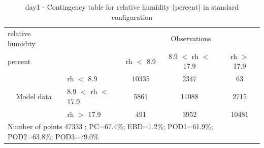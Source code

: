 \begin{table}[p!]
\begin{center}
\begin{tabular}{llccc}
\hline
{relative humidity}                                       &                                                    & \multicolumn{3}{c}{Observations}                 \\
{percent}                                       &                             & rh $<$ 8.9   & 8.9 $<$ rh $<$ 17.9 & rh $>$ 17.9 \\
\hline
\multicolumn{1}{c}{\multirow{3}{*}{Model data}}  & rh $<$ 8.9             & 10335                & 2347                       & 63              \\
                                                 & 8.9  $<$ rh $<$ 17.9 & 5861                & 11088                       & 2715              \\
                                                 & rh $>$ 17.9             & 491                & 3952                       & 10481              \\
\hline
\multicolumn{5}{l}{ Number of points        47333 ; PC=67.4\%; EBD=1.2\%; POD1=61.9\%; POD2=63.8\%; POD3=79.0\%}
\end{tabular}
\end{center}
\caption{day1 - Contingency table for  relative humidity (percent) in standard configuration}
\label{tab:contingencyrhBEF:day1}
\end{table}
